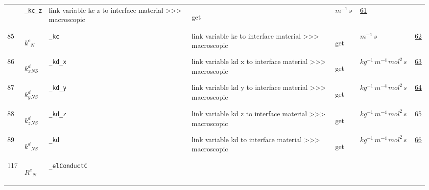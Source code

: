 \begin{longtable}{|p{1cm}|p{2.5cm}|p{4.5cm}|p{8cm}|p{3.0cm}|p{3cm}|p{1cm}|}
             & \verb|_kc_z|
             & link variable kc z to interface material >>> macroscopic
             & \begin{lay}get \end{lay}
             & $ m^{-1} \,s \, $
             & \hyperlink{"e:61"}{ 61 }
                 \\
    85
             & \hypertarget{"v:85"}{ $ {{k^c}}{_{N}} $}
             & \verb|_kc|
             & link variable kc to interface material >>> macroscopic
             & \begin{lay}get \end{lay}
             & $ m^{-1} \,s \, $
             & \hyperlink{"e:62"}{ 62 }
                 \\
    86
             & \hypertarget{"v:86"}{ $ {{k^d_x}}{_{{N S}}} $}
             & \verb|_kd_x|
             & link variable kd x to interface material >>> macroscopic
             & \begin{lay}get \end{lay}
             & $ kg^{-1} \,m^{-4} \,mol^{2} \,s \, $
             & \hyperlink{"e:63"}{ 63 }
                 \\
    87
             & \hypertarget{"v:87"}{ $ {{k^d_y}}{_{{N S}}} $}
             & \verb|_kd_y|
             & link variable kd y to interface material >>> macroscopic
             & \begin{lay}get \end{lay}
             & $ kg^{-1} \,m^{-4} \,mol^{2} \,s \, $
             & \hyperlink{"e:64"}{ 64 }
                 \\
    88
             & \hypertarget{"v:88"}{ $ {{k^d_z}}{_{{N S}}} $}
             & \verb|_kd_z|
             & link variable kd z to interface material >>> macroscopic
             & \begin{lay}get \end{lay}
             & $ kg^{-1} \,m^{-4} \,mol^{2} \,s \, $
             & \hyperlink{"e:65"}{ 65 }
                 \\
    89
             & \hypertarget{"v:89"}{ $ {{k^d}}{_{{N S}}} $}
             & \verb|_kd|
             & link variable kd to interface material >>> macroscopic
             & \begin{lay}get \end{lay}
             & $ kg^{-1} \,m^{-4} \,mol^{2} \,s \, $
             & \hyperlink{"e:66"}{ 66 }
                 \\
    117
             & \hypertarget{"v:117"}{ $ {{R^e}}{_{N}} $}
             & \verb|_elConductC|

\end{longtable}
